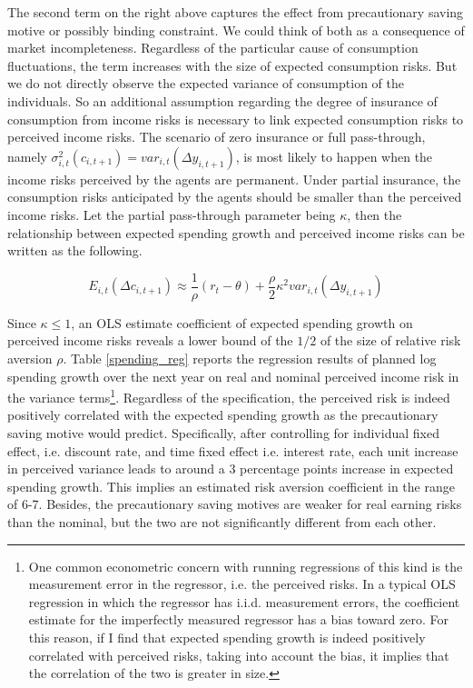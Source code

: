 The second term on the right above captures the effect from precautionary saving motive or possibly binding constraint. We could think of both as a consequence of market incompleteness\citep{parker2005precautionary}. Regardless of the particular cause of consumption fluctuations, the term increases with the size of expected consumption risks. But we do not directly observe the expected variance of consumption of the individuals. So an additional assumption regarding the degree of insurance of consumption from income risks is necessary to link expected consumption risks to perceived income risks. The scenario of zero insurance or full pass-through, namely $\sigma^2_{i,t}(c_{i,t+1})=var_{i,t}(\Delta y_{i,t+1})$, is most likely to happen when the income risks perceived by the agents are permanent. Under partial insurance, the consumption risks anticipated by the agents should be smaller than the perceived income risks. Let the partial pass-through parameter being $\kappa$, then the relationship between expected spending growth and perceived income risks can be written as the following. 


\begin{equation}
    E_{i,t}(\Delta c_{i,t+1}) \approx \frac{1}{\rho}(r_t-\theta) + \frac{\rho}{2}\kappa^2 var_{i,t}(\Delta y_{i,t+1})
\end{equation}

Since $\kappa\leq 1$, an OLS estimate coefficient of expected spending growth on perceived income risks reveals a lower bound of the $1/2$ of the size of relative risk aversion $\rho$. Table \ref{spending_reg} reports the regression results of planned
log spending growth over the next year on real and nominal perceived income risk in the variance terms\footnote{One common econometric concern with running regressions of this kind is the measurement error in the regressor, i.e. the perceived risks. In a typical OLS regression in which the regressor has i.i.d. measurement errors, the coefficient estimate for the imperfectly measured regressor has a bias toward zero. For this reason, if I find that expected spending growth is indeed positively correlated with perceived risks, taking into account the bias, it implies that the correlation of the two is greater in size.}. Regardless of the specification, the perceived risk is indeed positively correlated with the expected spending growth as the precautionary saving motive would predict. Specifically, after controlling for individual fixed effect, i.e. discount rate, and time fixed effect i.e. interest rate, each unit increase in perceived variance leads to around a 3 percentage points increase in expected spending growth. This implies an estimated risk aversion coefficient in the range of 6-7. Besides, the precautionary saving motives are weaker for real earning risks than the nominal, but the two are not significantly different from each other. 

